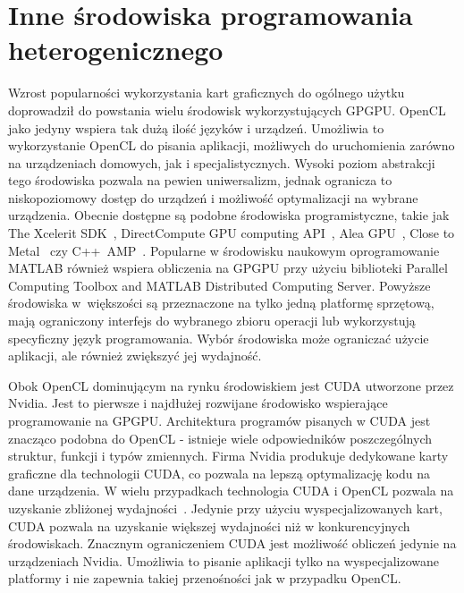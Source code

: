 \section{Inne środowiska programowania heterogenicznego}\label{sec:OpenC61asdL}

Wzrost popularności wykorzystania kart graficznych do ogólnego użytku doprowadził do powstania wielu środowisk wykorzystujących GPGPU. OpenCL jako jedyny wspiera tak dużą ilość języków i urządzeń. Umożliwia to wykorzystanie OpenCL do pisania aplikacji, możliwych do uruchomienia zarówno na urządzeniach domowych, jak i specjalistycznych. Wysoki poziom abstrakcji tego środowiska pozwala na pewien uniwersalizm, jednak ogranicza to niskopoziomowy dostęp do urządzeń i możliwość optymalizacji na wybrane urządzenia. Obecnie dostępne są podobne środowiska programistyczne, takie jak The Xcelerit SDK~\cite{b30},  DirectCompute GPU computing API~\cite{b31}, Alea GPU~\cite{b32}, Close to Metal~\cite{b33} czy C++~AMP~\cite{b34}. Popularne w środowisku naukowym oprogramowanie MATLAB również wspiera obliczenia na GPGPU przy użyciu biblioteki Parallel Computing Toolbox and MATLAB Distributed Computing Server. Powyższe środowiska w~większości są przeznaczone na tylko jedną platformę sprzętową, mają ograniczony interfejs do wybranego zbioru operacji lub wykorzystują specyficzny język programowania. Wybór środowiska może ograniczać użycie aplikacji, ale również zwiększyć jej wydajność.

Obok OpenCL dominującym na rynku środowiskiem jest CUDA utworzone przez Nvidia. Jest to pierwsze i najdłużej rozwijane środowisko wspierające programowanie na GPGPU. Architektura programów pisanych w CUDA jest znacząco podobna do OpenCL - istnieje wiele odpowiedników poszczególnych struktur, funkcji i typów zmiennych. Firma Nvidia produkuje dedykowane karty graficzne dla technologii CUDA, co pozwala na lepszą optymalizację kodu na dane urządzenia. W wielu przypadkach technologia CUDA i OpenCL pozwala na uzyskanie zbliżonej wydajności~\cite{b35}. Jedynie przy użyciu wyspecjalizowanych kart, CUDA pozwala na uzyskanie większej wydajności niż w konkurencyjnych środowiskach. Znacznym ograniczeniem CUDA jest możliwość obliczeń jedynie na urządzeniach Nvidia. Umożliwia to pisanie aplikacji tylko na wyspecjalizowane platformy i nie zapewnia takiej przenośności jak w przypadku OpenCL.



